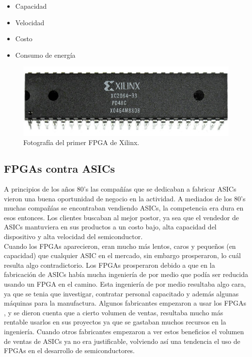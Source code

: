 \documentclass[twoside,spanish,ESP,MSc]{plantillaLabUPV}
\theoremstyle{definition}
\newcommand{\f}{FPGA }
\newcommand{\fs}{FPGAs }
\begin{document}
\begin{itemize}
\item Capacidad
\item Velocidad
\item Costo
\item Consumo de energía
\end{itemize} 

\begin{figure}[h]
\centering
\includegraphics[scale=0.3]{ima/xc2064}
\caption{Fotografía del primer \f de Xilinx.%
\label{ffpga}}
\end{figure}

\subsection*{FPGAs contra ASICs}
A principios de los años 80's las compañías que se dedicaban a fabricar ASICs vieron una buena oportunidad de negocio en la actividad. A mediados de los 80's muchas compañías se encontraban vendiendo ASICs, la competencia era dura en esos entonces. Los clientes buscaban al mejor postor, ya sea que el vendedor de ASICs mantuviera en sus productos a un costo bajo, alta capacidad del dispositivo y alta velocidad del semiconductor. \\

Cuando los \fs aparecieron, eran mucho más lentos, caros y pequeños (en capacidad) que cualquier ASIC en el mercado, sin embargo prosperaron, lo cuál resulta algo contradictorio. Los \fs prosperaron debido a que en la fabricación de ASICs había mucha ingeniería de por medio que podía ser reducida usando un FPGA en el camino. Esta ingeniería de por medio resultaba algo cara, ya que se tenia que investigar, contratar personal capacitado y además algunas máquinas para la manufactura. Algunos fabricantes empezaron a usar los \fs, y se dieron cuenta que a cierto volumen de ventas, resultaba mucho más rentable usarlos en sus proyectos ya que se gastaban muchos recursos en la ingeniería. Cuando otros fabricantes empezaron a ver estos beneficios el volumen de ventas de ASICs ya no era justificable, volviendo así una tendencia el uso de FPGAs en el desarrollo de semiconductores.\\
\end{document}
